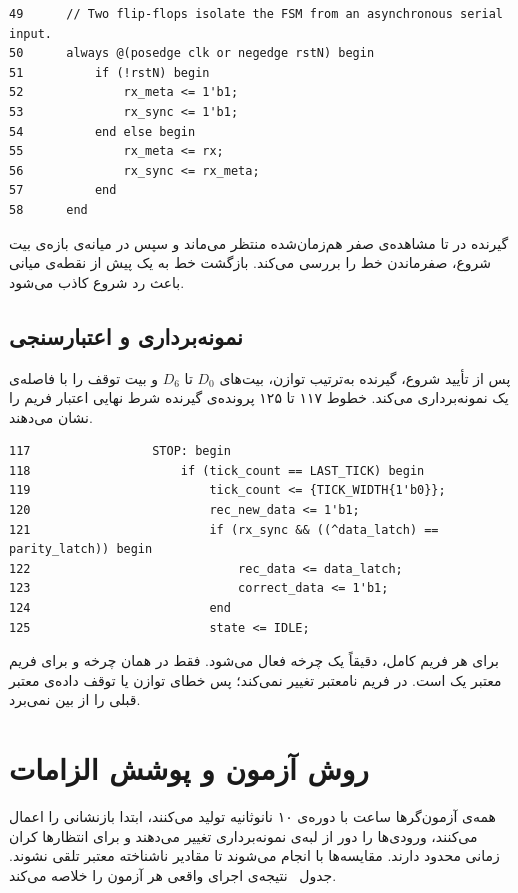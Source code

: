 \begin{dsdlcodeblock}
\begin{verbatim}
49      // Two flip-flops isolate the FSM from an asynchronous serial input.
50      always @(posedge clk or negedge rstN) begin
51          if (!rstN) begin
52              rx_meta <= 1'b1;
53              rx_sync <= 1'b1;
54          end else begin
55              rx_meta <= rx;
56              rx_sync <= rx_meta;
57          end
58      end
\end{verbatim}
\end{dsdlcodeblock}

گیرنده در  تا مشاهده‌ی صفر هم‌زمان‌شده منتظر می‌ماند و سپس در میانه‌ی بازه‌ی
بیت شروع، صفرماندن خط را بررسی می‌کند. بازگشت خط به یک پیش از نقطه‌ی میانی باعث رد
شروع کاذب می‌شود.

\subsection{نمونه‌برداری و اعتبارسنجی}

پس از تأیید شروع، گیرنده به‌ترتیب توازن، بیت‌های $D_0$ تا $D_6$ و بیت توقف را با فاصله‌ی
یک  نمونه‌برداری می‌کند. خطوط ۱۱۷ تا ۱۲۵ پرونده‌ی گیرنده شرط نهایی اعتبار
فریم را نشان می‌دهند.

\begin{dsdlcodeblock}
\begin{verbatim}
117                 STOP: begin
118                     if (tick_count == LAST_TICK) begin
119                         tick_count <= {TICK_WIDTH{1'b0}};
120                         rec_new_data <= 1'b1;
121                         if (rx_sync && ((^data_latch) == parity_latch)) begin
122                             rec_data <= data_latch;
123                             correct_data <= 1'b1;
124                         end
125                         state <= IDLE;
\end{verbatim}
\end{dsdlcodeblock}

برای هر فریم کامل،  دقیقاً یک چرخه فعال می‌شود. 
فقط در همان چرخه و برای فریم معتبر یک است.  در فریم نامعتبر تغییر نمی‌کند؛
پس خطای توازن یا توقف داده‌ی معتبر قبلی را از بین نمی‌برد.

\section{روش آزمون و پوشش الزامات}

همه‌ی آزمون‌گرها ساعت با دوره‌ی ۱۰ نانوثانیه تولید می‌کنند، ابتدا بازنشانی را اعمال می‌کنند،
ورودی‌ها را دور از لبه‌ی نمونه‌برداری تغییر می‌دهند و برای انتظارها کران زمانی محدود دارند.
مقایسه‌ها با  انجام می‌شوند تا مقادیر ناشناخته معتبر تلقی نشوند.
جدول~ نتیجه‌ی اجرای واقعی هر آزمون را خلاصه می‌کند.

